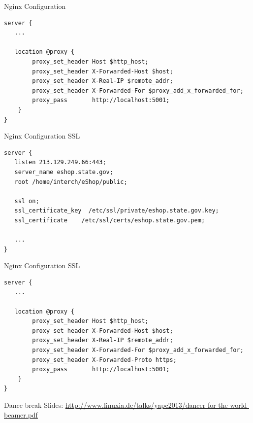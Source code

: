 \begin{frame}[fragile]{Nginx Configuration}
\begin{lstlisting}
server {
   ...

   location @proxy {
        proxy_set_header Host $http_host;
        proxy_set_header X-Forwarded-Host $host;
        proxy_set_header X-Real-IP $remote_addr;
        proxy_set_header X-Forwarded-For $proxy_add_x_forwarded_for;
        proxy_pass       http://localhost:5001;
    }
}
\end{lstlisting}
\end{frame}

\begin{frame}[fragile]{Nginx Configuration SSL}
\begin{lstlisting}
server {
   listen 213.129.249.66:443;
   server_name eshop.state.gov;
   root /home/interch/eShop/public;

   ssl on;
   ssl_certificate_key  /etc/ssl/private/eshop.state.gov.key;
   ssl_certificate    /etc/ssl/certs/eshop.state.gov.pem;

   ...
}
\end{lstlisting}
\end{frame}

\begin{frame}[fragile]{Nginx Configuration SSL}
\begin{lstlisting}
server {
   ...

   location @proxy {
        proxy_set_header Host $http_host;
        proxy_set_header X-Forwarded-Host $host;
        proxy_set_header X-Real-IP $remote_addr;
        proxy_set_header X-Forwarded-For $proxy_add_x_forwarded_for;
        proxy_set_header X-Forwarded-Proto https;
        proxy_pass       http://localhost:5001;
    }
}
\end{lstlisting}
\end{frame}

\begin{frame}{Dance break}
Slides:
\url{http://www.linuxia.de/talks/yapc2013/dancer-for-the-world-beamer.pdf}
\end{frame}



